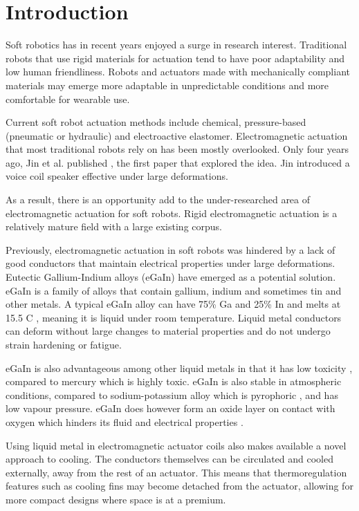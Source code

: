 \documentclass[a4paper,12pt]{article}
\begin{document}
\newpage

\section{Introduction}

Soft robotics has in recent years enjoyed a surge in research interest. Traditional robots that use rigid materials for actuation tend to have poor adaptability and low human friendliness. Robots and actuators made with mechanically compliant materials may emerge more adaptable in unpredictable conditions and more comfortable for wearable use. 

Current soft robot actuation methods include chemical, pressure-based (pneumatic or hydraulic) and electroactive elastomer. Electromagnetic actuation that most traditional robots rely on has been mostly overlooked. Only four years ago, Jin et al. published \cite{jinStretchableLoudspeakerUsing2015}, the first paper that explored the idea. Jin introduced a voice coil speaker effective under large deformations. 

As a result, there is an opportunity add to the under-researched area of electromagnetic actuation for soft robots. Rigid electromagnetic actuation is a relatively mature field with a large existing corpus. 

Previously, electromagnetic actuation in soft robots was hindered by a lack of good conductors that maintain electrical properties under large deformations. Eutectic Gallium-Indium alloys (eGaIn) have emerged as a potential solution. eGaIn is a family of alloys that contain gallium, indium and sometimes tin and other metals. A typical eGaIn alloy can have 75\% Ga and 25\% In and melts at 15.5 \degree C \cite{dickeyEutecticGalliumIndiumEGaIn2008}, meaning it is liquid under room temperature. Liquid metal conductors can deform without large changes to material properties and do not undergo strain hardening or fatigue.

eGaIn is also advantageous among other liquid metals in that it has low toxicity \cite{dickeyEutecticGalliumIndiumEGaIn2008}, compared to mercury which is highly toxic. eGaIn is also stable in atmospheric conditions, compared to sodium-potassium alloy which is pyrophoric \cite{houghtonHazards2007}, and has low vapour pressure. eGaIn does however form an oxide layer on contact with oxygen which hinders its fluid and electrical properties \cite{liuCharacterizationNontoxicLiquidMetal2012}.

Using liquid metal in electromagnetic actuator coils also makes available a novel approach to cooling. The conductors themselves can be circulated and cooled externally, away from the rest of an actuator. This means that thermoregulation features such as cooling fins may become detached from the actuator, allowing for more compact designs where space is at a premium.
\end{document}
